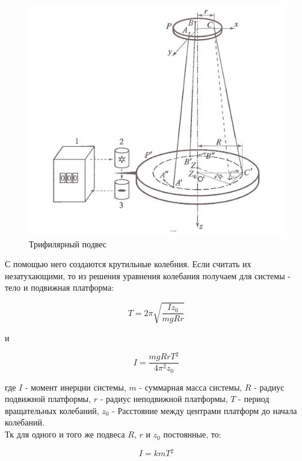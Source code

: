 \documentclass[a4paper]{article}
\begin{document}
\begin{figure}[!ht]
    \centering
    \includegraphics[scale=0.3]{podves.jpg}
    \caption{Трифилярный подвес}
\end{figure}

\newpage

С помощью него создаются крутильные колебния. Если считать их незатухающими, то из решения уравнения колебания получаем для системы - тело и подвижная платформа:

\begin{equation}
	{T} = {2\pi}\sqrt{\frac{Iz_0}{mgRr}}
\end{equation}

и

\begin{equation}
	{I} = \frac{mgRrT{^2}}{4\pi{^2}z_0}
\end{equation}

где $I$ - момент инерции системы, $m$ - суммарная масса системы, $R$ - радиус подвижной платформы, $r$ - радиус неподвижной платформы, $T$ - период вращательных колебаний, $z_0$ - Расстояние между центрами платформ до начала колебаний.\\

Тк для одного и того же подвеса $R$, $r$ и $z_0$ постоянные, то:

\begin{equation}
	{I} = {kmT{^2}}
\end{equation}
\end{document}
